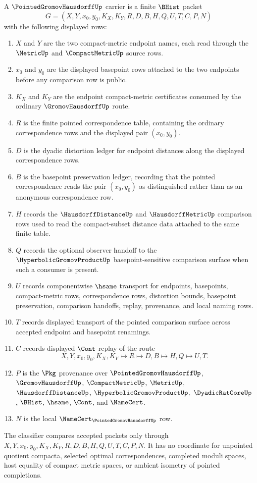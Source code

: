 \begin{definition}
\label{def:pointed-gromov-hausdorff-carrier}
A $\PointedGromovHausdorffUp$ carrier is a finite $\BHist$ packet
$$
G=(X,Y,x_0,y_0,K_X,K_Y,R,D,B,H,Q,U,T,C,P,N)
$$
with the following displayed rows:
\begin{enumerate}
\item $X$ and $Y$ are the two compact-metric endpoint names, each read through the $\MetricUp$ and $\CompactMetricUp$ source rows.
\item $x_0$ and $y_0$ are the displayed basepoint rows attached to the two endpoints before any comparison row is public.
\item $K_X$ and $K_Y$ are the endpoint compact-metric certificates consumed by the ordinary $\GromovHausdorffUp$ route.
\item $R$ is the finite pointed correspondence table, containing the ordinary correspondence rows and the displayed pair $(x_0,y_0)$.
\item $D$ is the dyadic distortion ledger for endpoint distances along the displayed correspondence rows.
\item $B$ is the basepoint preservation ledger, recording that the pointed correspondence reads the pair $(x_0,y_0)$ as distinguished rather than as an anonymous correspondence row.
\item $H$ records the $\HausdorffDistanceUp$ and $\HausdorffMetricUp$ comparison rows used to read the compact-subset distance data attached to the same finite table.
\item $Q$ records the optional observer handoff to the $\HyperbolicGromovProductUp$ basepoint-sensitive comparison surface when such a consumer is present.
\item $U$ records componentwise $\hsame$ transport for endpoints, basepoints, compact-metric rows, correspondence rows, distortion bounds, basepoint preservation, comparison handoffs, replay, provenance, and local naming rows.
\item $T$ records displayed transport of the pointed comparison surface across accepted endpoint and basepoint renamings.
\item $C$ records displayed $\Cont$ replay of the route
$$
X,Y,x_0,y_0,K_X,K_Y \longmapsto R \longmapsto D,B \longmapsto H,Q \longmapsto U,T .
$$
\item $P$ is the $\Pkg$ provenance over $\PointedGromovHausdorffUp$, $\GromovHausdorffUp$, $\CompactMetricUp$, $\MetricUp$, $\HausdorffDistanceUp$, $\HyperbolicGromovProductUp$, $\DyadicRatCoreUp$, $\BHist$, $\hsame$, $\Cont$, and $\NameCert$.
\item $N$ is the local $\NameCert_{\PointedGromovHausdorffUp}$ row.
\end{enumerate}
The classifier compares accepted packets only through $X,Y,x_0,y_0,K_X,K_Y,R,D,B,H,Q,U,T,C,P,N$. It has no coordinate for unpointed quotient compacta, selected optimal correspondences, completed moduli spaces, host equality of compact metric spaces, or ambient isometry of pointed completions.
\end{definition}

